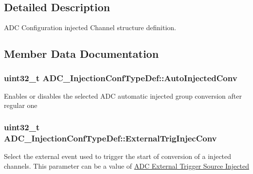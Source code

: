 \subsection{Detailed Description}
A\+DC Configuration injected Channel structure definition. 

\subsection{Member Data Documentation}
\subsubsection[{\texorpdfstring{Auto\+Injected\+Conv}{AutoInjectedConv}}]{\setlength{\rightskip}{0pt plus 5cm}uint32\+\_\+t A\+D\+C\+\_\+\+Injection\+Conf\+Type\+Def\+::\+Auto\+Injected\+Conv}\hypertarget{struct_a_d_c___injection_conf_type_def_ab0e74342214a5610e6b4f1f080f10544}{}\label{struct_a_d_c___injection_conf_type_def_ab0e74342214a5610e6b4f1f080f10544}
Enables or disables the selected A\+DC automatic injected group conversion after regular one 
\subsubsection[{\texorpdfstring{External\+Trig\+Injec\+Conv}{ExternalTrigInjecConv}}]{\setlength{\rightskip}{0pt plus 5cm}uint32\+\_\+t A\+D\+C\+\_\+\+Injection\+Conf\+Type\+Def\+::\+External\+Trig\+Injec\+Conv}\hypertarget{struct_a_d_c___injection_conf_type_def_ac3431d4d3e3089f0db271bfb06dbffc0}{}\label{struct_a_d_c___injection_conf_type_def_ac3431d4d3e3089f0db271bfb06dbffc0}
Select the external event used to trigger the start of conversion of a injected channels. This parameter can be a value of \hyperlink{group___a_d_c_ex___external__trigger___source___injected}{A\+DC External Trigger Source Injected} 
